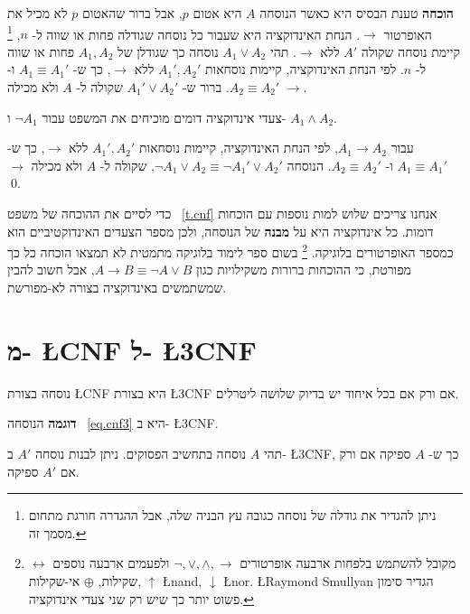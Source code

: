 \textbf{הוכחה}
טענת הבסיס היא כאשר הנוסחה
$A$
היא אטום
$p$,
אבל ברור שהאטום
$p$
לא מכיל את האופרטור
$\rightarrow$.
הנחת האינדוקציה היא שעבור כל נוסחה שגודלה פחות או שווה ל-%
$n$,%
\footnote{%
ניתן להגדיר את גודלה של נוסחה כגובה עץ הבניה שלה, אבל ההגדרה חורגת מתחום מסמך זה.%
}
קיימת נוסחה שקולה
$A'$
ללא 
$\rightarrow$.
תהי 
$A_1 \vee A_2$
נוסחה כך שגודלן של
$A_1, A_2$
פחות או שווה ל-%
$n$.
לפי הנחת האינדוקציה, קיימות נוסחאות 
$A_1', A_2'$
ללא 
$\rightarrow$,
כך ש-%
$A_1\equiv A_1'$
ו-%
$A_2\equiv A_2'$.
ברור ש-%
$A_1' \vee A_2'$
שקולה ל-%
$A$
ולא מכילה
$\rightarrow$.

צעדי אינדוקציה דומים מוכיחים את המשפט עבור
$\neg A_1$
ו-%
$A_1 \wedge A_2$.

עבור
$A_1 \rightarrow A_2$,
לפי הנחת האינדוקציה, קיימות נוסחאות
$A_1', A_2'$
ללא
$\rightarrow$,
כך ש-%
$A_1\equiv A_1'$
ו-%
$A_2\equiv A_2'$.
הנוסחה
$\neg A_1 \vee A_2 \equiv \neg A_1' \vee A_2'$,
שקולה ל-%
$A$
ולא מכילה
$\rightarrow$.\qed

כדי לסיים את ההוכחה של משפט~%
\ref{t.cnf}
אנחנו צריכים שלוש למות נוספות עם הוכחות דומות. כל אינדוקציה היא על 
\textbf{מבנה}
של הנוסחה, ולכן מספר הצעדים האינדוקטיביים הוא כמספר האופרטורים בלוגיקה.%
\footnote{%
מקובל להשתמש בלפחות ארבעה אופרטורים
$\neg,\vee,\wedge,\rightarrow$
ולפעמים ארבעה נוספים
$\leftrightarrow$ שקילות, $\oplus$ אי-שקילות, $\uparrow$ \L{nand}, $\downarrow$ \L{nor}.
\L{Raymond Smullyan}
הגדיר סימון פשוט יותר כך שיש רק שני צעדי אינדוקציה.}
בשום ספר לימוד בלוגיקה מתמטית לא תמצאו הוכחה כל כך מפורטת, כי ההוכחות ברורות משקילויות כגון
$A\rightarrow B\equiv\neg A \vee B$,
אבל חשוב להבין שמשתמשים באינדוקציה בצורה לא-מפורשת.

\section{%
מ-
\L{\small CNF}
ל-
\L{\small 3CNF}
}

\begin{definition}
נוסחה בצורת 
\L{\small CNF}
היא בצורת
\L{\small 3CNF}
אם ורק אם בכל איחוד יש בדיוק שלושה ליטרלים.
\end{definition}

\vspace*{-10pt}

\textbf{דוגמה}
הנוסחה~%
\ref{eq.cnf3}
היא ב-%
\L{\small 3CNF}.
\begin{theorem}\label{t.cnf3}
תהי
$A$
נוסחה בתחשיב הפסוקים. ניתן לבנות נוסחה
$A'$
ב-%
\L{\small 3CNF},
כך ש-%
$A$
ספיקה אם ורק אם
$A'$
ספיקה.
\end{theorem}

